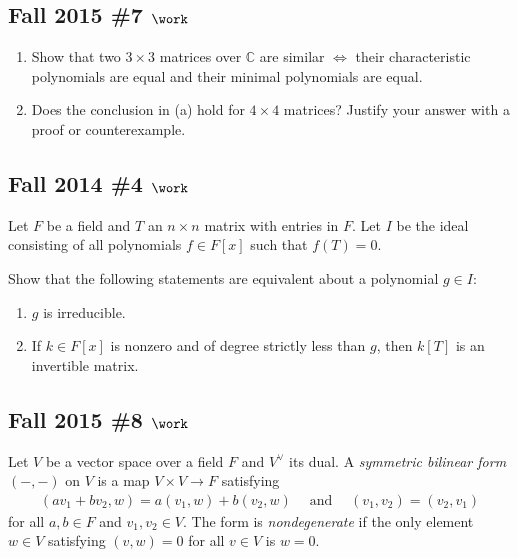 \hypertarget{fall-2015-7-work}{%
\subsection{\texorpdfstring{Fall 2015 \#7
\(\work\)}{Fall 2015 \#7 \textbackslash work}}\label{fall-2015-7-work}}

\begin{enumerate}
\def\labelenumi{\alph{enumi}.}
\item
  Show that two \(3\times 3\) matrices over \({\mathbb{C}}\) are similar
  \(\iff\) their characteristic polynomials are equal and their minimal
  polynomials are equal.
\item
  Does the conclusion in (a) hold for \(4\times 4\) matrices? Justify
  your answer with a proof or counterexample.
\end{enumerate}

\hypertarget{fall-2014-4-work}{%
\subsection{\texorpdfstring{Fall 2014 \#4
\(\work\)}{Fall 2014 \#4 \textbackslash work}}\label{fall-2014-4-work}}

Let \(F\) be a field and \(T\) an \(n\times n\) matrix with entries in
\(F\). Let \(I\) be the ideal consisting of all polynomials
\(f\in F[x]\) such that \(f(T) =0\).

Show that the following statements are equivalent about a polynomial
\(g\in I\):

\begin{enumerate}
\def\labelenumi{\alph{enumi}.}
\item
  \(g\) is irreducible.
\item
  If \(k\in F[x]\) is nonzero and of degree strictly less than \(g\),
  then \(k[T]\) is an invertible matrix.
\end{enumerate}

\hypertarget{fall-2015-8-work}{%
\subsection{\texorpdfstring{Fall 2015 \#8
\(\work\)}{Fall 2015 \#8 \textbackslash work}}\label{fall-2015-8-work}}

Let \(V\) be a vector space over a field \(F\) and \(V^\vee\) its dual.
A \emph{symmetric bilinear form} \(({-}, {-})\) on \(V\) is a map
\(V\times V\to F\) satisfying
\begin{align*}
(av_1 + b v_2, w) = a(v_1, w) + b(v_2, w) {\quad \operatorname{and} \quad} (v_1, v_2) = (v_2, v_1)
\end{align*}
for all \(a, b\in F\) and \(v_1, v_2 \in V\). The form is
\emph{nondegenerate} if the only element \(w\in V\) satisfying
\((v, w) = 0\) for all \(v\in V\) is \(w=0\).

